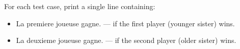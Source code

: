 For each test case, print a single line containing:

\begin{itemize}
    \item La premiere joueuse gagne. --- if the first player (younger sister) wins.
    \item La deuxieme joueuse gagne. --- if the second player (older sister) wins.
\end{itemize}